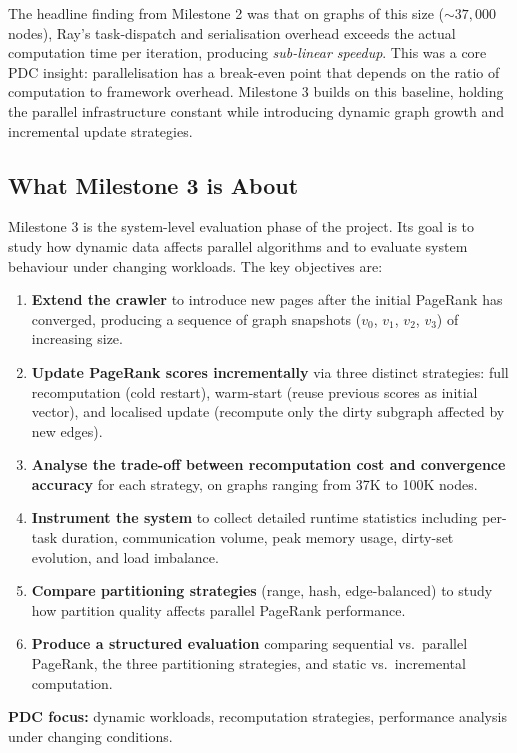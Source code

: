 \documentclass[11pt,a4paper]{article}
\begin{document}
The headline finding from Milestone 2 was that on graphs of this size
(${\sim}37{,}000$ nodes), Ray's task-dispatch and serialisation overhead
exceeds the actual computation time per iteration, producing
\emph{sub-linear speedup}. This was a core PDC insight: parallelisation
has a break-even point that depends on the ratio of computation to
framework overhead. Milestone 3 builds on this baseline, holding the
parallel infrastructure constant while introducing dynamic graph growth
and incremental update strategies.

\subsection{What Milestone 3 is About}
Milestone 3 is the system-level evaluation phase of the project. Its goal
is to study how dynamic data affects parallel algorithms and to evaluate
system behaviour under changing workloads. The key objectives are:
\begin{enumerate}
    \item \textbf{Extend the crawler} to introduce new pages after the
    initial PageRank has converged, producing a sequence of graph
    snapshots ($v_0$, $v_1$, $v_2$, $v_3$) of increasing size.
    \item \textbf{Update PageRank scores incrementally} via three
    distinct strategies: full recomputation (cold restart), warm-start
    (reuse previous scores as initial vector), and localised update
    (recompute only the dirty subgraph affected by new edges).
    \item \textbf{Analyse the trade-off between recomputation cost and
    convergence accuracy} for each strategy, on graphs ranging from
    37K to 100K nodes.
    \item \textbf{Instrument the system} to collect detailed runtime
    statistics including per-task duration, communication volume, peak
    memory usage, dirty-set evolution, and load imbalance.
    \item \textbf{Compare partitioning strategies} (range, hash,
    edge-balanced) to study how partition quality affects parallel
    PageRank performance.
    \item \textbf{Produce a structured evaluation} comparing sequential
    vs.~parallel PageRank, the three partitioning strategies, and static
    vs.~incremental computation.
\end{enumerate}

\textbf{PDC focus:} dynamic workloads, recomputation strategies,
performance analysis under changing conditions.
\end{document}
